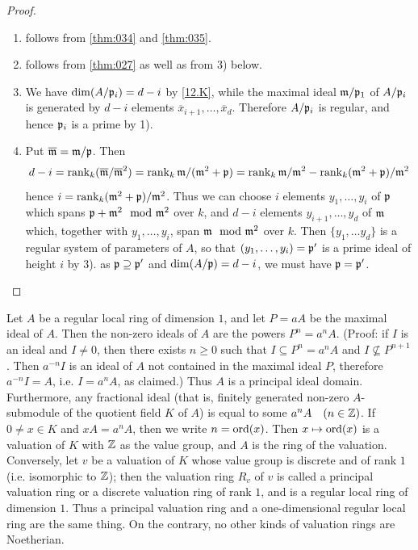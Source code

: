\documentclass[../main]{subfiles}
\begin{document}
\begin{proof}
\begin{enumerate}[label=(\arabic*)]
    \item follows from \ref{thm:034} and \ref{thm:035}.
    
    \item follows from \ref{thm:027} as well as from 3) below.
    
    \item We have $\operatorname{dim}(A / \mathfrak{p}_i)=d-i$ by \ref{12.K}, while the maximal ideal $\mathfrak{m}/ \mathfrak{p}_1$ of $A/ \mathfrak{p}_i$ is generated by $d-i$ elements $\overline{x}_{i+1}, \dots, \overline{x}_d$. Therefore $A/\mathfrak{p}_i$ is regular, and hence $\mathfrak{p}_i$ is a prime by 1).
    
    \item Put $\overline{\mathfrak{m}}=\mathfrak{m} / \mathfrak{p}$. Then \[d-i=\operatorname{rank}_k(\overline{\mathfrak{m}}/\overline{\mathfrak{m}}^2) = \operatorname{rank}_k \mathfrak{m}/(\mathfrak{m}^2+\mathfrak{p}) = \operatorname{rank}_k \mathfrak{m}/\mathfrak{m}^2 - \operatorname{rank}_k (\mathfrak{m}^2+\mathfrak{p})/\mathfrak{m}^2\] hence $i=\operatorname{rank}_k (\mathfrak{m}^2+\mathfrak{p})/\mathfrak{m}^2$. Thus we can choose $i$ elements $y_1,\dots, y_i$ of $\mathfrak{p}$ which spans $\ideal{p}+\ideal{m}^2 \mod \ideal{m}^2$ over $k$, and $d-i$ elements $y_{i+1},\dots , y_d$ of $\mathfrak{m}$ which, together with $y_1,\dots,y_i$, span $\ideal{m}\mod \ideal{m}^2$ over $k$. Then $\{y_1,\dots y_d\}$ is a regular system of parameters of $A$, so that $(y_1,\dots,y_i) =\mathfrak{p}'$ is a prime ideal of height $i$ by 3). as $\mathfrak{p}\supseteq \mathfrak{p}'$ and $\operatorname{dim}(A/\mathfrak{p})=d-i$, we must have $\mathfrak{p}=\mathfrak{p}'$.
\end{enumerate}
\end{proof}

\newparagraph Let $A$ be a regular local ring of dimension $1$, and let $P= aA$ be the maximal ideal of $A$. Then the non-zero ideals of $A$ are the powers $P^n=a^nA$. (Proof: if $I$ is an ideal and $I \neq 0$, then there exists $n \geqslant 0$ such that $I \subseteq P^n=a^n A$ and $I \nsubseteq P^{n+1}$. Then $a^{-n} I$ is an ideal of $A$ not contained in the maximal ideal $P$, therefore $a^{-n} I=A$, i.e. $I=a^n A$, as claimed.) Thus $A$ is a principal ideal domain. Furthermore, any fractional ideal (that is, finitely generated non-zero $A$-submodule of the quotient field $K$ of $A$) is equal to some $a^n A\for{n\in\bZ}$. If $0 \neq x \in K$ and $x A=a^n A$, then we write $n=\operatorname{ord}(x)$. Then $x \mapsto \operatorname{ord}(x)$ is a valuation of $K$ with $\mathbb{Z}$ as the value group, and $A$ is the ring of the valuation. Conversely, let $v$ be a valuation of $K$ whose value group is discrete and of rank $1$ (i.e. isomorphic to $\mathbb{Z}$); then the valuation ring $R_v$ of $v$ is called a principal valuation ring or a discrete valuation ring of rank $1$, and is a regular local ring of dimension $1$. Thus a principal valuation ring and a one-dimensional regular local ring are the same thing. On the contrary, no other kinds of valuation rings are Noetherian.
\end{document}
